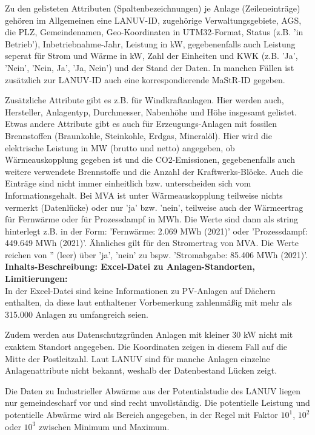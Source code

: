 			Zu den gelisteten Attributen (Spaltenbezeichnungen) je Anlage (Zeileneinträge) gehören im Allgemeinen eine LANUV-ID, zugehörige Verwaltungsgebiete, AGS, die PLZ, Gemeindenamen, Geo-Koordinaten in UTM32-Format, Status (z.B. 'in Betrieb'), Inbetriebnahme-Jahr, Leistung in kW, gegebenenfalls auch Leistung seperat für Strom und Wärme in kW, Zahl der Einheiten und KWK (z.B. 'Ja', 'Nein', 'Nein, Ja', 'Ja, Nein') und der Stand der Daten. In manchen Fällen ist zusätzlich zur LANUV-ID auch eine korrespondierende MaStR-ID gegeben.
			
			Zusätzliche Attribute gibt es z.B. für Windkraftanlagen. Hier werden auch, Hersteller, Anlagentyp, Durchmesser, Nabenhöhe und Höhe insgesamt gelistet. Etwas andere Attribute gibt es auch für Erzeugungs-Anlagen mit fossilen Brennstoffen (Braunkohle, Steinkohle, Erdgas, Mineralöl). Hier wird die elektrische Leistung in MW (brutto und netto) angegeben, ob Wärmeauskopplung gegeben ist und die CO2-Emissionen, gegebenenfalls auch weitere verwendete Brennstoffe und die Anzahl der Kraftwerks-Blöcke. Auch die Einträge sind nicht immer einheitlich bzw. unterscheiden sich vom Informationsgehalt. Bei MVA ist unter Wärmeauskopplung teilweise nichts vermerkt (Datenlücke) oder nur 'ja' bzw. 'nein', teilweise auch der Wärmeertrag für Fernwärme oder für Prozessdampf in MWh. Die Werte sind dann als string hinterlegt z.B. in der Form: 'Fernwärme: 2.069 MWh (2021)' oder 'Prozessdampf: 449.649 MWh (2021)'. Ähnliches gilt für den Stromertrag von MVA. Die Werte reichen von '' (leer) über 'ja', 'nein' zu bspw. 'Stromabgabe: 85.406 MWh (2021)'. \\
			
			\textbf{Inhalts-Beschreibung: Excel-Datei zu Anlagen-Standorten, Limitierungen:}\\
			In der Excel-Datei sind keine Informationen zu PV-Anlagen auf Dächern enthalten, da diese laut enthaltener Vorbemerkung zahlenmäßig mit mehr als 315.000 Anlagen zu umfangreich seien. 
			
			Zudem werden aus Datenschutzgründen Anlagen mit kleiner 30 kW nicht mit exaktem Standort angegeben. Die Koordinaten zeigen in diesem Fall auf die Mitte der Postleitzahl. Laut LANUV sind für manche Anlagen einzelne Anlagenattribute nicht bekannt, weshalb der Datenbestand Lücken zeigt. 
			
			Die Daten zu Industrieller Abwärme aus der Potentialstudie des LANUV liegen nur gemeindescharf vor und sind recht unvollständig. Die potentielle Leistung und potentielle Abwärme wird als Bereich angegeben, in der Regel mit Faktor $10^1$, $10^2$ oder $10^3$ zwischen Minimum und Maximum. 
			
